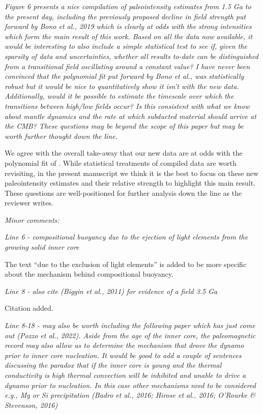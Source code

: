 \documentclass[11pt, letterpaper]{article}
\begin{document}
\begin{flushleft}
\itshape
Figure 6 presents a nice compilation of paleointensity estimates from 1.5 Ga to the present day, including the previously proposed decline in field strength put forward by Bono et al., 2019 which is clearly at odds with the strong intensities which form the main result of this work. Based on all the data now available, it would be interesting to also include a simple statistical test to see if, given the sparsity of data and uncertainties, whether all results to-date can be distinguished from a transitional field oscillating around a constant value? I have never been convinced that the polynomial fit put forward by Bono et al., was statistically robust but it would be nice to quantitatively show it isn't with the new data. Additionally, would it be possible to estimate the timescale over which the transitions between high/low fields occur? Is this consistent with what we know about mantle dynamics and the rate at which subducted material should arrive at the CMB? These questions may be beyond the scope of this paper but may be worth further thought down the line.
\upshape

We agree with the overall take-away that our new data are at odds with the polynomial fit of \cite{Bono2019a}. While statistical treatments of compiled data \cite[e.g.][]{Biggin2015a} are worth revisiting, in the present manuscript we think it is the best to focus on these new paleointensity estimates and their relative strength to highlight this main result. These questions are well-positioned for further analysis down the line as the reviewer writes.


\itshape
Minor comments:
\upshape

\textit{Line 6 - compositional buoyancy due to the ejection of light elements from the growing solid inner core}

The text ``due to the exclusion of light elements'' is added to be more specific about the mechanism behind compositional buoyancy.

\textit{Line 8 - also cite (Biggin et al., 2011) for evidence of a field 3.5 Ga}

Citation added. 

\textit{Line 8-18 - may also be worth including the following paper which has just come out (Pozzo et al., 2022). Aside from the age of the inner core, the paleomagnetic record may also allow us to determine the mechanism that drove the dynamo prior to inner core nucleation. It would be good to add a couple of sentences discussing the paradox that if the inner core is young and the thermal conductivity is high thermal convection will be inhibited and unable to drive a dynamo prior to nucleation. In this case other mechanisms need to be considered e.g., Mg or Si precipitation (Badro et al., 2016; Hirose et al., 2016; O'Rourke \& Stevenson, 2016)}


\end{flushleft}
\end{document}
